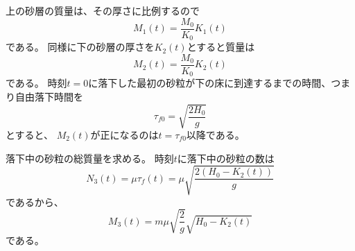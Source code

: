 \documentclass[]{article}
\begin{document}
\color{blue}
上の砂層の質量は、その厚さに比例するので
\begin{equation} \label{250917175554} 
   M_1(t) = \frac{M_0}{K_0} K_1(t)
\end{equation}
である。
同様に下の砂層の厚さを$K_2(t)$とすると質量は
\begin{equation} \label{250917175633} 
   M_2(t) =  \frac{M_0}{K_0} K_2(t)
\end{equation}
である。
時刻$t=0$に落下した最初の砂粒が下の床に到達するまでの時間、つまり自由落下時間を
\begin{equation} \label{250703153227} 
   \tau_{f0} = \sqrt{\frac{2H_0}{g}}
\end{equation}
とすると、
$M_2(t)$が正になるのは$t=\tau_{f0}$以降である。


落下中の砂粒の総質量を求める。
時刻$t$に落下中の砂粒の数は
\begin{equation} \label{250917175724} 
   N_3(t) = \mu \tau_f(t) = \mu \sqrt{\frac{2(H_0-K_2(t))}{g}} 
\end{equation}
であるから、
\begin{equation} \label{250917175839} 
   M_3(t) = m \mu \sqrt{\frac{2}{g}} \sqrt{H_0-K_2(t)}
\end{equation}
である。
\end{document}
